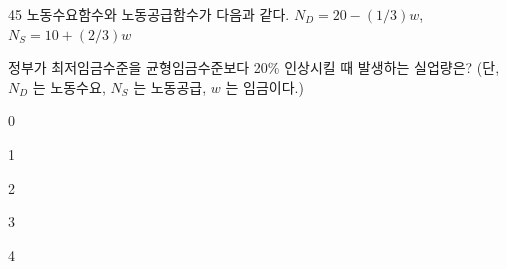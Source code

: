 \begin{question}{45}
노동수요함수와 노동공급함수가 다음과 같다.
$N_{ D } =20-(1/3)w$, $N_{ S } =10+(2/3)w$ \par
정부가 최저임금수준을 균형임금수준보다 20\% 인상시킬 때 발생하는 실업량은? (단, $N_{ D }$ 는 노동수요, $N_{ S }$ 는 노동공급, $w$ 는 임금이다.) \par
\begin{choices}
  \item 0
  \item 1
  \item 2
  \item 3
  \item 4
\end{choices}
\end{question}
